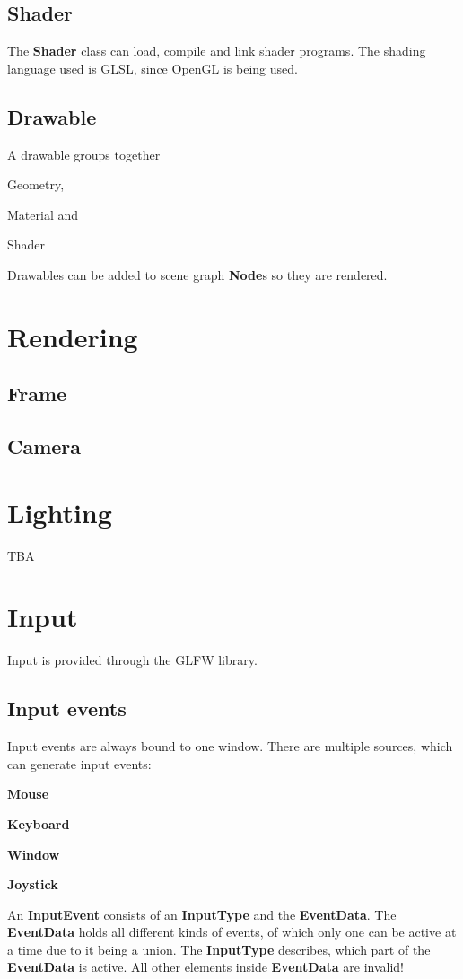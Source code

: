 \documentclass[12p, paper=a4, leqno, colorinlistoftodos]{article}
\newenvironment{packed_itemize}
{\begin{itemize}
		\setlength{\itemsep}{0pt}
		\setlength{\parskip}{0pt}
		\setlength{\parsep}{0pt}
	}{\end{itemize}}
\begin{document}
			
		\subsection{Shader}
			The \textbf{Shader} class can load, compile and link shader programs. The shading language used is GLSL, since OpenGL is being used.
		
		\subsection{Drawable}
			A drawable groups together
			\begin{packed_itemize}
				\item Geometry,
				\item Material and
				\item Shader
			\end{packed_itemize}
		
			Drawables can be added to scene graph \textbf{Node}s so they are rendered.
		
	\pagebreak
	\section{Rendering}
		
		\subsection{Frame}
		
		\subsection{Camera}
		
	
	\pagebreak
	\section{Lighting}
		TBA
		
		
		
	\pagebreak
	\section{Input}
	Input is provided through the GLFW library.
		
		\subsection{Input events}
		Input events are always bound to one window. There are multiple sources, which can generate input events:
		\begin{packed_itemize}
			\item \textbf{Mouse}
			\item \textbf{Keyboard}
			\item \textbf{Window}
			\item \textbf{Joystick}
		\end{packed_itemize}
		An \textbf{InputEvent} consists of an \textbf{InputType} and the \textbf{EventData}. The \textbf{EventData} holds all different kinds of events, of which only one can be active at a time due to it being a union. The \textbf{InputType} describes, which part of the \textbf{EventData} is active. All other elements inside \textbf{EventData} are invalid!
		
\end{document}
